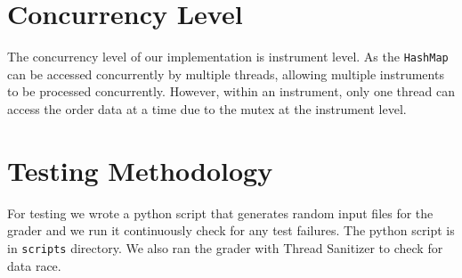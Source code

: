 \documentclass[11pt]{article}
\begin{document}


\section{Concurrency Level}\label{sec:Concurrency Level} %

The concurrency level of our implementation is instrument level. As the \verb|HashMap| can be
accessed concurrently by multiple threads, allowing multiple instruments to be processed
concurrently. However, within an instrument, only one thread can access the order data at a time
due to the mutex at the instrument level.


\section{Testing Methodology}\label{sec:Testing Methodology} %

For testing we wrote a python script that generates random input files for the grader and we run it
continuously check for any test failures. The python script is in \texttt{scripts} directory. We also ran the grader with Thread Sanitizer to check for data race.

\end{document}
